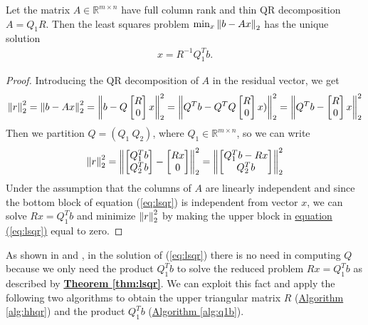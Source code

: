 \begin{thm}
\label{thm:lsqr}
Let the matrix $A\in \mathbb{R}^{m\times n}$ have full column rank and thin QR decomposition $A = Q_1R$. Then the least squares problem $\min_{x} \left\lVert b - Ax \right\rVert_2$ has the unique solution
\begin{align*}
    x = R^{-1}Q_1^Tb.
\end{align*}
\end{thm}
\begin{proof}
Introducing the QR decomposition of $A$ in the residual vector, we get
\begin{align*}
    \left\lVert r \right\rVert_2^2 = \left\lVert b - Ax \right\rVert_2^2 = \left\lVert b - Q\begin{bmatrix}R \\ 0\end{bmatrix}x \right\rVert_2^2 = \left\lVert Q^Tb-Q^TQ\begin{bmatrix}R \\ 0\end{bmatrix}x) \right\rVert_2^2 = \left\lVert Q^Tb - \begin{bmatrix}R \\ 0\end{bmatrix}x \right\rVert_2^2
\end{align*}
Then we partition $Q = (Q_1\ Q_2)$, where $Q_1\in \mathbb{R}^{m\times n}$, so we can write
\begin{equation}
\label{eq:lsqr}
    \left\lVert r \right\rVert_2^2 = \left\lVert \begin{bmatrix}Q_1^Tb \\ Q_2^Tb\end{bmatrix} - \begin{bmatrix}Rx \\ 0\end{bmatrix} \right\rVert_2^2 = \left\lVert \begin{bmatrix}Q_1^Tb - Rx \\ Q_2^Tb\end{bmatrix} \right\rVert_2^2
\end{equation}
Under the assumption that the columns of $A$ are linearly independent and since the bottom block of equation (\ref{eq:lsqr}) is independent from vector $x$, we can solve $Rx = Q_1^Tb$ and minimize $\left\lVert r \right\rVert_2^2$ by making the upper block in \hyperref[eq:lsqr]{equation (\ref{eq:lsqr})} equal to zero.
\end{proof}
As shown in \parencite[Lecture 10]{Bau} and \parencite[Chap. 5.3]{elden}, in the solution of (\ref{eq:lsqr}) there is no need in computing $Q$ because we only need the product $Q_1^Tb$ to solve the reduced problem $Rx=Q_1^Tb$ as described by \hyperref[thm:lsqr]{\textbf{Theorem \ref{thm:lsqr}}}. We can exploit this fact and apply the following two algorithms to obtain the upper triangular matrix $R$ (\hyperref[alg:hhqr]{Algorithm \ref{alg:hhqr}}) and the product $Q_1^Tb$ (\hyperref[alg:q1b]{Algorithm \ref{alg:q1b}}).

